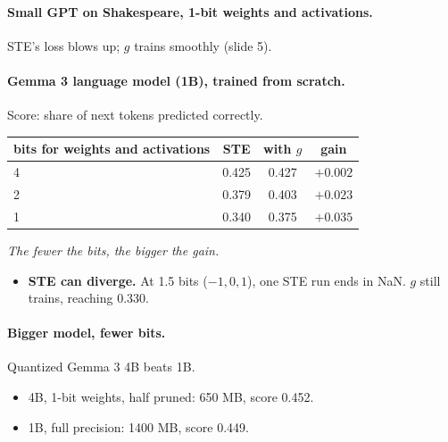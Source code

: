 \documentclass[11pt]{article}
\begin{document}
{\setlength{\abovedisplayskip}{3pt}\setlength{\belowdisplayskip}{3pt}
\paragraph{Small GPT on Shakespeare, 1-bit weights and activations.} STE's loss blows up; $g$ trains smoothly (slide 5).

\vspace{6pt}
\paragraph{Gemma 3 language model (1B), trained from scratch.} Score: share of next tokens predicted correctly.
\begin{center}
\renewcommand{\arraystretch}{1.3}
\begin{tabular}{lccc}
\toprule
bits for weights and activations & STE & with $g$ & gain \\
\midrule
4 & 0.425 & 0.427 & $+0.002$ \\
2 & 0.379 & 0.403 & $+0.023$ \\
1 & 0.340 & 0.375 & $+0.035$ \\
\bottomrule
\end{tabular}\par\vspace{8pt}
\textit{The fewer the bits, the bigger the gain.}
\end{center}
\begin{itemize}
\item \textbf{STE can diverge.} At 1.5 bits ($-1,0,1$), one STE run ends in NaN. $g$ still trains, reaching 0.330.
\end{itemize}

\vspace{16pt}
\noindent
\begin{minipage}[t]{0.48\textwidth}
\paragraph{Bigger model, fewer bits.} Quantized Gemma 3 4B beats 1B.\par\vspace{6pt}
\begin{itemize}\setlength{\itemsep}{6pt}
\item 4B, 1-bit weights, half pruned: 650 MB, score 0.452.
\item 1B, full precision: 1400 MB, score 0.449.
\end{itemize}
\end{minipage}\hfill
\begin{minipage}[t]{0.48\textwidth}

\end{minipage}}
\end{document}
